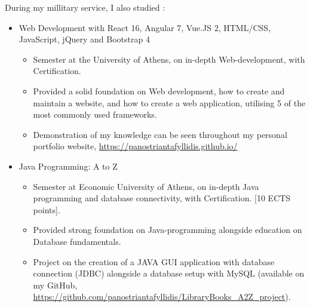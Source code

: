 
During my millitary service, I also studied :
\begin{itemize}
    \item Web Development with React 16, Angular 7, Vue.JS 2, HTML/CSS, JavaScript, jQuery and Bootstrap 4
          \begin{itemize}
              \item Semester at the University of Athens, on in-depth Web-development, with Certification.
              \item Provided a solid foundation on Web development, how to create and maintain a website, and how to create a web application, utilising 5 of the most commonly used frameworks.
              \item Demonstration of my knowledge can be seen throughout my personal portfolio website, \url{https://panostriantafyllidis.github.io/}
          \end{itemize}
    \item Java Programming: A to Z
          \begin{itemize}
              \item Semester at Economic University of Athens, on in-depth Java programming and database connectivity, with Certification. [10 ECTS points].
              \item Provided strong foundation on Java-programming alongside education on Database fundamentals.
              \item Project on the creation of a JAVA GUI application with database connection (JDBC) alongside a database setup with MySQL (available on my GitHub, \url{https://github.com/panostriantafyllidis/LibraryBooks_A2Z_project}).
          \end{itemize}
\end{itemize}


